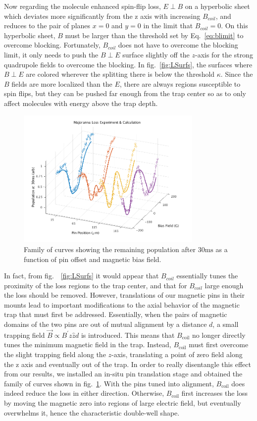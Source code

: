 \documentclass[%
 reprint,
 amsmath,amssymb,
 aps,
prl,
]{revtex4-1}
\begin{document}
Now regarding the molecule enhanced spin-flip loss, $E\!\perp\! B$ on a hyperbolic sheet which deviates more significantly from the z axis with increasing $B_{coil}$, and reduces to the pair of planes $x=0$ and $y=0$ in the limit that $B_{coil} = 0$. On this hyperbolic sheet, $B$ must be larger than the threshold set by Eq.~\ref{eq:blimit} to overcome blocking. Fortunately, $B_{coil}$ does not have to overcome the blocking limit, it only needs to push the $B\!\perp\! E$ surface slightly off the $z$-axis for the strong  quadrupole fields to overcome the blocking. In fig.~\ref{fig:LSurfs}, the surfaces where $B\!\perp\! E$ are colored wherever the splitting there is below the threshold $\kappa$. Since the $B$ fields are more localized than the $E$, there are always regions susceptible to spin flips, but they can be pushed far enough from the trap center so as to only affect molecules with energy above the trap depth.

\begin{figure}
\includegraphics[width=90mm]{V-to-W-plot-3D-dave.png}%
\caption{
Family of curves showing the remaining population after $30 \text{ms}$ as a function of pin offset and magnetic bias field.
\label{fig:WVplot}}
\end{figure}

In fact, from fig.~~\ref{fig:LSurfs} it would appear that $B_{coil}$ essentially tunes the proximity of the loss regions to the trap center, and that for $B_{coil}$ large enough the loss should be removed. However, translations of our magnetic pins in their mounts lead to important modifications to the axial behavior of the magnetic trap that must first be addressed. Essentially, when the pairs of magnetic domains of the two pins are out of mutual alignment by a distance $d$, a small trapping field $\vec{B}\propto B^\prime z\hat{z} d$ is introduced. This means that $B_\text{coil}$ no longer directly tunes the minimum magnetic field in the trap. Instead, $B_\text{coil}$ must first overcome the slight trapping field along the $z$-axis, translating a point of zero field along the z axis and eventually out of the trap. In order to really disentangle this effect from our results, we installed an in-situ pin translation stage and obtained the family of curves shown in fig.~\ref{fig:WVplot}. With the pins tuned into alignment, $B_\text{coil}$ does indeed reduce the loss in either direction. Otherwise, $B_\text{coil}$ first increases the loss by moving the magnetic zero into regions of large electric field, but eventually overwhelms it, hence the characteristic double-well shape. 
\end{document}
